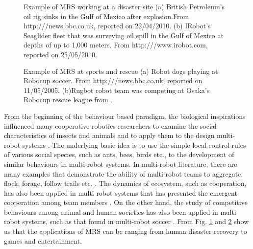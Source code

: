 \begin{figure}
\centering
{} 
\hspace{0.25cm}
\caption{Example of MRS working at a disaster site (a) British Petroleum's oil rig sinks in the Gulf of Mexico after explosion.\protect\newline From http:///news.bbc.co.uk, reported on 22/04/2010. 
(b) IRobot's Seaglider fleet that was surveying oil spill in the Gulf of Mexico at depths of up to 1,000 meters. From http:///www.irobot.com, reported on 25/05/2010.}
\label{fig:bp-oil-disaster}
\end{figure}
\begin{figure}
\centering
{} 
\hspace{0.25cm}
\caption{Example of MRS at sports and rescue (a) Robot dogs playing at Robocup soccer. \protect\newline From http:///news.bbc.co.uk, reported on 11/05/2005. 
(b)Rugbot robot team was competing at Osaka's Robocup rescue league from \protect{}.}
\label{fig:robocup}
\end{figure}
From the beginning of the behaviour based paradigm, the biological inspirations influenced many cooperative robotics researchers to examine the social characteristics of insects and animals and to apply them to the design multi-robot systems \cite{Arkin1998}. The underlying basic idea is to use the simple local control rules of various social species, such as ants, bees, birds etc., to the development of similar behaviours in multi-robot systems. In multi-robot literature, there are many examples that demonstrate the ability of multi-robot teams to aggregate, flock, forage, follow trails etc. \cite{Bonabeau+1999,Mataric1994}. The dynamics of ecosystem, such as cooperation, has also been applied in multi-robot systems that has presented the emergent cooperation among team members \cite{Mcfarland1994,Martinoli+1996}. On the other hand, the study of competitive behaviours among animal and human societies has also been applied in multi-robot systems, such as that found in multi-robot soccer \cite{Asada+1999}. From Fig. \ref{fig:bp-oil-disaster} and \ref{fig:robocup} show us that the applications of MRS can be ranging from human disaster recovery to games and entertainment.\\
